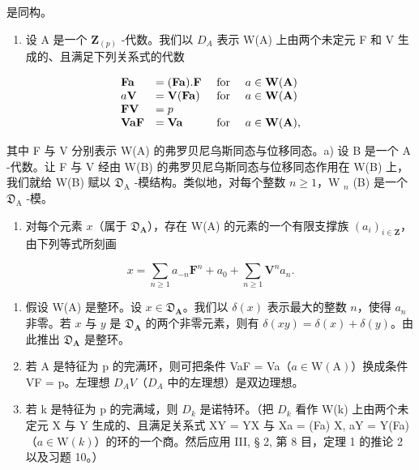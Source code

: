 是同构。

\begin{enumerate}
\def\labelenumi{\arabic{enumi})}
\setcounter{enumi}{21}
\tightlist
\item
  设 A 是一个 \(\mathbf{Z}_{(p)}\) -代数。我们以 \(D_{A}\) 表示 W(A) 上由两个未定元 F 和 V 生成的、且满足下列关系式的代数
\end{enumerate}

\[
\begin{array}{l l l l} \mathbf {F a} & = (\mathbf {F a}). \mathbf {F} & \text { for } & a \in \mathbf {W} (\mathbf {A}) \\ a \mathbf {V} & = \mathbf {V} (\mathbf {F a}) & \text { for } & a \in \mathbf {W} (\mathbf {A}) \\ \mathbf {F V} & = p & & \\ \mathbf {V a F} & = \mathbf {V a} & \text { for } & a \in \mathbf {W} (\mathbf {A}), \end{array}
\]

其中 F 与 V 分别表示 W(A) 的弗罗贝尼乌斯同态与位移同态。a) 设 B 是一个 A -代数。让 F 与 V 经由 W(B) 的弗罗贝尼乌斯同态与位移同态作用在 W(B) 上，我们就给 W(B) 赋以 \(\mathfrak{D}_{\mathrm{A}}\) -模结构。类似地，对每个整数 \(n \geqslant 1\)，W \(_n\) (B) 是一个 \(\mathfrak{D}_{\mathrm{A}}\) -模。

\begin{enumerate}
\def\labelenumi{\alph{enumi})}
\setcounter{enumi}{1}
\tightlist
\item
  对每个元素 \(x\)（属于 \(\mathfrak{D}_{\mathbf{A}}\)），存在 W(A) 的元素的一个有限支撑族 \((a_{i})_{i\in\mathbf{Z}}\)，由下列等式所刻画
\end{enumerate}

\[
x = \sum_ {n \geqslant 1} a _ {- n} \mathbf {F} ^ {n} + a _ {0} + \sum_ {n \geqslant 1} \mathbf {V} ^ {n} a _ {n}.
\]

\begin{enumerate}
\def\labelenumi{\alph{enumi})}
\setcounter{enumi}{2}
\item
  假设 W(A) 是整环。设 \(x \in \mathfrak{D}_{\mathbf{A}}\)。我们以 \(\delta(x)\) 表示最大的整数 \(n\)，使得 \(a_{n}\) 非零。若 \(x\) 与 \(y\) 是 \(\mathfrak{D}_{\mathbf{A}}\) 的两个非零元素，则有 \(\delta(xy) = \delta(x) + \delta(y)\)。由此推出 \(\mathfrak{D}_{\mathbf{A}}\) 是整环。
\item
  若 A 是特征为 p 的完满环，则可把条件 VaF = Va（\(a \in \mathrm{W}(\mathrm{A})\)）换成条件 VF = p。左理想 \(D_{A}V\)（\(D_{A}\) 中的左理想）是双边理想。
\item
  若 k 是特征为 p 的完满域，则 \(D_{k}\) 是诺特环。（把 \(D_{k}\) 看作 W(k) 上由两个未定元 X 与 Y 生成的、且满足关系式 XY = YX 与 Xa = (Fa) X, aY = Y(Fa)（\(a \in \mathrm{W}(k)\)）的环的一个商。然后应用 III, § 2, 第 8 目，定理 1 的推论 2 以及习题 10。）
\end{enumerate}

